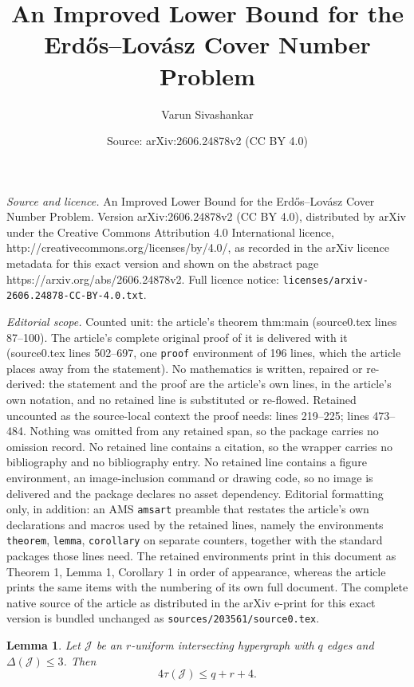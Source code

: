 \documentclass[10pt,a4paper]{amsart}
\title{An Improved Lower Bound for the Erd\H{o}s--Lov\'asz Cover Number Problem}
\author{Varun Sivashankar}
\date{Source: arXiv:2606.24878v2 (CC BY 4.0)}
\newtheorem{lemma}{Lemma}
\newcommand{\Del}{\Delta}
\newcommand{\cJ}{\mathcal J}
\newcommand{\ta}{\tau}
\begin{document}
\maketitle

\noindent\emph{Source and licence.} An Improved Lower Bound for the Erd\H{o}s--Lov\'asz Cover Number Problem. Version arXiv:2606.24878v2 (CC BY 4.0), distributed by arXiv under the Creative Commons Attribution 4.0 International licence, http://creativecommons.org/licenses/by/4.0/, as recorded in the arXiv licence metadata for this exact version and shown on the abstract page https://arxiv.org/abs/2606.24878v2. Full licence notice: \texttt{licenses/arxiv-2606.24878-CC-BY-4.0.txt}.\par\smallskip

\noindent\textit{Editorial scope.} Counted unit: the article's theorem thm:main (source0.tex lines 87--100). The article's complete original proof of it is delivered with it (source0.tex lines 502--697, one \texttt{proof} environment of 196 lines, which the article places away from the statement). No mathematics is written, repaired or re-derived: the statement and the proof are the article's own lines, in the article's own notation, and no retained line is substituted or re-flowed.  Retained uncounted as the source-local context the proof needs: lines 219--225; lines 473--484.  Nothing was omitted from any retained span, so the package carries no omission record.  No retained line contains a citation, so the wrapper carries no bibliography and no bibliography entry.  No retained line contains a figure environment, an image-inclusion command or drawing code, so no image is delivered and the package declares no asset dependency.  Editorial formatting only, in addition: an AMS \texttt{amsart} preamble that restates the article's own declarations and macros used by the retained lines, namely the environments \texttt{theorem}, \texttt{lemma}, \texttt{corollary} on separate counters, together with the standard packages those lines need.  The retained environments print in this document as Theorem 1, Lemma 1, Corollary 1 in order of appearance, whereas the article prints the same items with the numbering of its own full document.  The complete native source of the article as distributed in the arXiv e-print for this exact version is bundled unchanged as \texttt{sources/203561/source0.tex}.
\begin{lemma}\label{lem:residual-cover}
Let $\cJ$ be an $r$-uniform intersecting hypergraph with $q$ edges and
$\Del(\cJ)\le 3$.  Then
\[
  4\ta(\cJ)\le q+r+4.
\]
\end{lemma}
\end{document}
